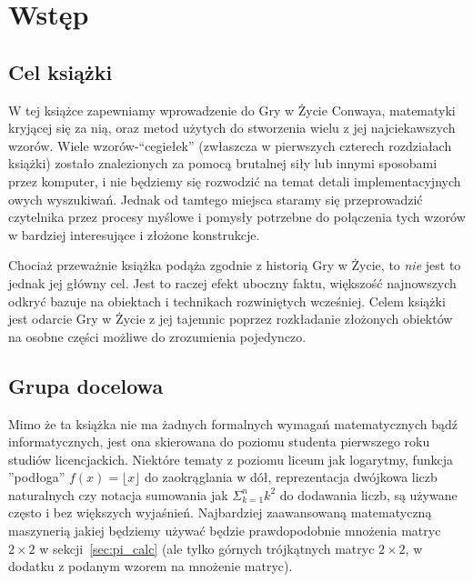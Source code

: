 \renewcommand{\chapterfolder}{preface/}
\chapter{Wstęp}


\section*{Cel książki}

W tej książce zapewniamy wprowadzenie do Gry w Życie Conwaya, matematyki kryjącej się za nią, oraz metod użytych do stworzenia wielu z jej najciekawszych wzorów. Wiele wzorów-``cegiełek'' (zwłaszcza w pierwszych czterech rozdziałach książki) zostało znalezionych za pomocą brutalnej siły lub innymi sposobami przez komputer, i nie będziemy się rozwodzić na temat detali implementacyjnych owych wyszukiwań. Jednak od tamtego miejsca staramy się przeprowadzić czytelnika przez procesy myślowe i pomysły potrzebne do połączenia tych wzorów w bardziej interesujące i złożone konstrukcje.

Chociaż przeważnie książka podąża zgodnie z historią Gry w Życie, to \emph{nie} jest to jednak jej główny cel. Jest to raczej efekt uboczny faktu, większość najnowszych odkryć bazuje na obiektach i technikach rozwiniętych wcześniej. Celem książki jest odarcie Gry w Życie z jej tajemnic poprzez rozkładanie złożonych obiektów na osobne części możliwe do zrozumienia pojedynczo.


\section*{Grupa docelowa}

Mimo że ta książka nie ma żadnych formalnych wymagań matematycznych bądź informatycznych, jest ona skierowana do poziomu studenta pierwszego roku studiów licencjackich. Niektóre tematy z poziomu liceum jak logarytmy, funkcja ''podłoga'' $f(x) = \lfloor x \rfloor$ do zaokrąglania w dół, reprezentacja dwójkowa liczb naturalnych czy notacja sumowania jak $\Sigma_{k=1}^n k^2$ do dodawania liczb, są używane często i bez większych wyjaśnień. Najbardziej zaawansowaną matematyczną maszynerią jakiej będziemy używać będzie prawdopodobnie mnożenia matryc $2 \times 2$ w sekcji~\ref{sec:pi_calc} (ale tylko górnych trójkątnych matryc $2 \times 2$, w dodatku z podanym wzorem na mnożenie matryc).

